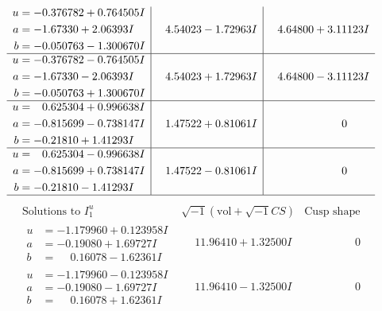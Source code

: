 \documentclass[1p]{elsarticle_modified}
\theoremstyle{definition}
\newcommand{\I}{\sqrt{-1}}
\begin{document}
$$\begin{array}{c|c|c}
\begin{aligned}
u &= -0.376782 + 0.764505 I \\
a &= -1.67330 + 2.06393 I \\
b &= -0.050763 - 1.300670 I\end{aligned}
 & \phantom{-}4.54023 - 1.72963 I & \phantom{-}4.64800 + 3.11123 I \\ \hline\begin{aligned}
u &= -0.376782 - 0.764505 I \\
a &= -1.67330 - 2.06393 I \\
b &= -0.050763 + 1.300670 I\end{aligned}
 & \phantom{-}4.54023 + 1.72963 I & \phantom{-}4.64800 - 3.11123 I \\ \hline\begin{aligned}
u &= \phantom{-}0.625304 + 0.996638 I \\
a &= -0.815699 - 0.738147 I \\
b &= -0.21810 + 1.41293 I\end{aligned}
 & \phantom{-}1.47522 + 0.81061 I & \phantom{-0.000000 } 0 \\ \hline\begin{aligned}
u &= \phantom{-}0.625304 - 0.996638 I \\
a &= -0.815699 + 0.738147 I \\
b &= -0.21810 - 1.41293 I\end{aligned}
 & \phantom{-}1.47522 - 0.81061 I & \phantom{-0.000000 } 0\\
 \hline 
 \end{array}$$\newpage$$\begin{array}{c|c|c}  
\text{Solutions to }I^u_{1}& \I (\text{vol} + \sqrt{-1}CS) & \text{Cusp shape}\\
 \hline 
\begin{aligned}
u &= -1.179960 + 0.123958 I \\
a &= -0.19080 + 1.69727 I \\
b &= \phantom{-}0.16078 - 1.62361 I\end{aligned}
 & \phantom{-}11.96410 + 1.32500 I & \phantom{-0.000000 } 0 \\ \hline\begin{aligned}
u &= -1.179960 - 0.123958 I \\
a &= -0.19080 - 1.69727 I \\
b &= \phantom{-}0.16078 + 1.62361 I\end{aligned}
 & \phantom{-}11.96410 - 1.32500 I & \phantom{-0.000000 } 0 \\ \hline\begin{aligned}

\end{aligned}
\end{array}$$
\end{document}
